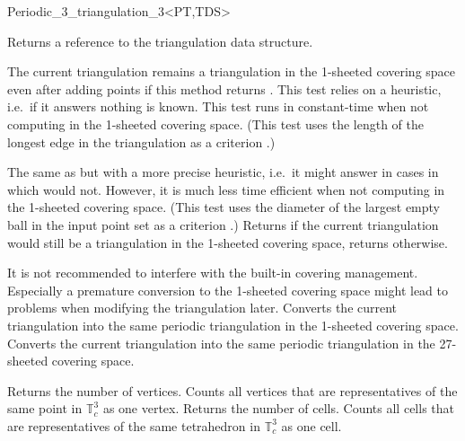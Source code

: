 \begin{ccRefClass}{Periodic_3_triangulation_3<PT,TDS>}
\begin{ccAdvanced}
{Returns a reference to the triangulation data structure.}

{The current triangulation remains a triangulation in the 1-sheeted
  covering space even after adding points if this method returns
  . This test relies on a heuristic, i.e.\ if it answers
   nothing is known. This test runs in constant-time when
  not computing in the 1-sheeted covering space. (This test uses the length
of the longest edge in the triangulation as a
criterion \cite{cgal:ct-c3pt-09}.)}

{The same as  but with
a more precise heuristic, i.e.\ it might answer  in cases in which
 would not. However, it is
much less time efficient when not computing in the 1-sheeted covering
space. (This test uses the diameter of the largest empty ball in the
input point set as a criterion \cite{cgal:ct-c3pt-09}.)}
\ccGlue
{}
{Returns  if the current triangulation would still be a
  triangulation in the 1-sheeted covering space, returns  otherwise.}

It is not recommended to interfere with the built-in covering
management. Especially a premature conversion to the 1-sheeted
covering space
might lead to problems when modifying the triangulation later.
{Converts the current triangulation into the same periodic
  triangulation in the 1-sheeted covering space.}
\ccGlue
{}
{Converts the current triangulation into the same periodic
  triangulation in the 27-sheeted covering space.}

\end{ccAdvanced}


{Returns the number of vertices. Counts all vertices that are
  representatives of the same point in $\mathbb T_c^3$ as one vertex.}
\ccGlue
{}
{Returns the number of cells. Counts all cells that are
  representatives of the same tetrahedron in $\mathbb T_c^3$ as one
  cell.}


\end{ccRefClass}
